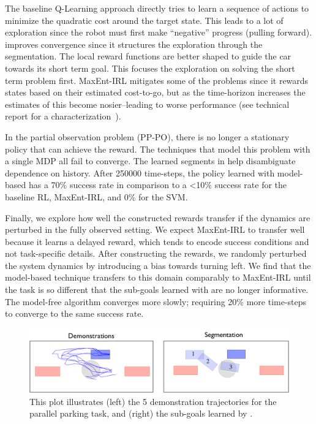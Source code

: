The baseline Q-Learning approach directly tries to learn a sequence of actions to minimize the quadratic cost around the target state. 
This leads to a lot of exploration since the robot must first make ``negative'' progress (pulling forward). 
\hirl improves convergence since it structures the exploration through the segmentation.
The local reward functions are better shaped to guide the car towards its short term goal.
This focuses the exploration on solving the short term problem first.
MaxEnt-IRL mitigates some of the problems since it rewards states based on their estimated cost-to-go, but as the time-horizon increases the estimates of this become nosier--leading to worse performance (see technical report for a characterization~\cite{krishnan2016hirl}).

In the partial observation problem (PP-PO), there is no longer a stationary policy that can achieve the reward.
The techniques that model this problem with a single MDP all fail to converge.
The learned segments in \hirl help disambiguate dependence on history.
After 250000 time-steps, the policy learned with model-based \hirl has a 70\% success rate in comparison to a <10\% success rate for the baseline RL, MaxEnt-IRL, and 0\% for the SVM.

Finally, we explore how well the constructed rewards transfer if the dynamics are perturbed in the fully observed setting.
We expect MaxEnt-IRL to transfer well because it learns a delayed reward, which tends to encode success conditions and not task-specific details.
After constructing the rewards, we randomly perturbed the system dynamics by introducing a bias towards turning left.
We find that the model-based \hirl technique transfers to this domain comparably to MaxEnt-IRL until the task is so different that the sub-goals learned with \hirl are no longer informative.
The model-free \hirl algorithm converges more slowly; requiring 20\% more time-steps to converge to the same success rate. 


\begin{figure}[t]
\centering
 \includegraphics[width=0.8\columnwidth]{exp/rc-car-segmentation.png}
 \caption{This plot illustrates (left) the 5 demonstration trajectories for the parallel parking task, and (right) the sub-goals learned by \hirl. \label{exp:rcsegmentation}}
\end{figure}


